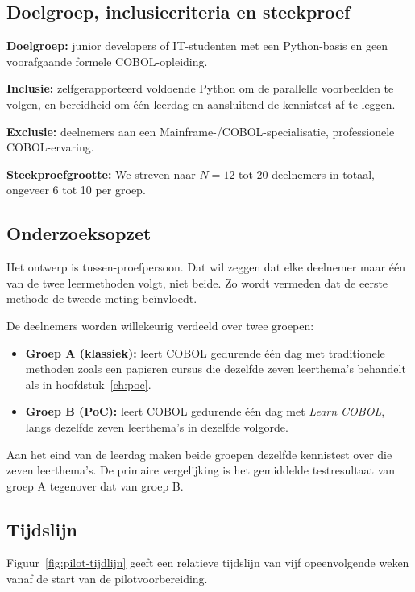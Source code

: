 \subsection{Doelgroep, inclusiecriteria en steekproef}

\textbf{Doelgroep:} junior developers of IT-studenten met een Python-basis en geen voorafgaande formele COBOL-opleiding.

\textbf{Inclusie:} zelfgerapporteerd voldoende Python om de parallelle voorbeelden te volgen, en bereidheid om één leerdag en aansluitend de kennistest af te leggen.

\textbf{Exclusie:} deelnemers aan een Mainframe-/COBOL-specialisatie, professionele COBOL-ervaring.

\textbf{Steekproefgrootte:} We streven naar \(N = 12\) tot \(20\) deelnemers in totaal, ongeveer 6 tot 10 per groep.

\subsection{Onderzoeksopzet}

Het ontwerp is tussen-proefpersoon. Dat wil zeggen dat elke deelnemer maar één van de twee leermethoden volgt, niet beide. Zo wordt vermeden dat de eerste methode de tweede meting beïnvloedt.

De deelnemers worden willekeurig verdeeld over twee groepen:
\begin{itemize}
    \item \textbf{Groep A (klassiek):} leert COBOL gedurende één dag met traditionele methoden zoals een papieren cursus die dezelfde zeven leerthema's behandelt als in hoofdstuk~\ref{ch:poc}.
    \item \textbf{Groep B (PoC):} leert COBOL gedurende één dag met \textit{Learn COBOL}, langs dezelfde zeven leerthema's in dezelfde volgorde.
\end{itemize}

Aan het eind van de leerdag maken beide groepen dezelfde kennistest over die zeven leerthema's. De primaire vergelijking is het gemiddelde testresultaat van groep A tegenover dat van groep B.

\subsection{Tijdslijn}

Figuur~\ref{fig:pilot-tijdlijn} geeft een relatieve tijdslijn van vijf opeenvolgende weken vanaf de start van de pilotvoorbereiding.

